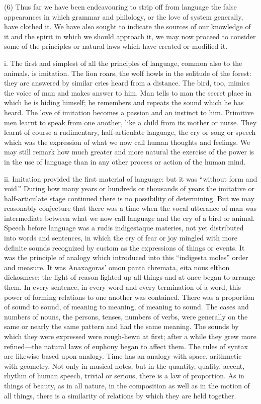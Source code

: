 \documentclass[11pt,letter]{article}
\begin{document}
\par  (6) Thus far we have been endeavouring to strip off from language the false appearances in which grammar and philology, or the love of system generally, have clothed it. We have also sought to indicate the sources of our knowledge of it and the spirit in which we should approach it, we may now proceed to consider some of the principles or natural laws which have created or modified it.

\par  i. The first and simplest of all the principles of language, common also to the animals, is imitation. The lion roars, the wolf howls in the solitude of the forest: they are answered by similar cries heard from a distance. The bird, too, mimics the voice of man and makes answer to him. Man tells to man the secret place in which he is hiding himself; he remembers and repeats the sound which he has heard. The love of imitation becomes a passion and an instinct to him. Primitive men learnt to speak from one another, like a child from its mother or nurse. They learnt of course a rudimentary, half-articulate language, the cry or song or speech which was the expression of what we now call human thoughts and feelings. We may still remark how much greater and more natural the exercise of the power is in the use of language than in any other process or action of the human mind.

\par  ii. Imitation provided the first material of language: but it was “without form and void.” During how many years or hundreds or thousands of years the imitative or half-articulate stage continued there is no possibility of determining. But we may reasonably conjecture that there was a time when the vocal utterance of man was intermediate between what we now call language and the cry of a bird or animal. Speech before language was a rudis indigestaque materies, not yet distributed into words and sentences, in which the cry of fear or joy mingled with more definite sounds recognized by custom as the expressions of things or events. It was the principle of analogy which introduced into this “indigesta moles” order and measure. It was Anaxagoras’ omou panta chremata, eita nous elthon diekosmese: the light of reason lighted up all things and at once began to arrange them. In every sentence, in every word and every termination of a word, this power of forming relations to one another was contained. There was a proportion of sound to sound, of meaning to meaning, of meaning to sound. The cases and numbers of nouns, the persons, tenses, numbers of verbs, were generally on the same or nearly the same pattern and had the same meaning. The sounds by which they were expressed were rough-hewn at first; after a while they grew more refined—the natural laws of euphony began to affect them. The rules of syntax are likewise based upon analogy. Time has an analogy with space, arithmetic with geometry. Not only in musical notes, but in the quantity, quality, accent, rhythm of human speech, trivial or serious, there is a law of proportion. As in things of beauty, as in all nature, in the composition as well as in the motion of all things, there is a similarity of relations by which they are held together.
\end{document}
